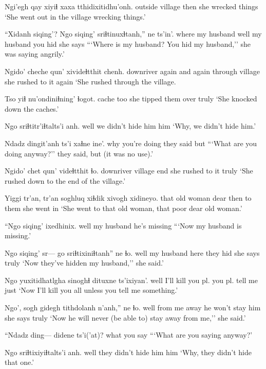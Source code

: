 \documentclass[12pt]{article}
\begin{document}
\gll Ngi'egh qay xiyiɬ {xaxa tthidixitidhu'onh.} 
outside village then {she wrecked things}
\glt `She went out in the village wrecking things.' 
\glend

\gll ``Xidanh siqing'? Ngo siqing' sriɬtinuxɬtanh,'' ne ts'in'. 
where {my husband} well {my husband} {you hid} {she says} {}
\glt ```Where is my husband? You hid my husband,'' she was saying angrily.' 
\glend

\gll Ngido' cheche {qun'} xivideɬtthit chenh. 
{downriver} {again and again} {through village} {she rushed to it} again 
\glt `She rushed through the village.
\glend

\gll Tso yiɬ nu'ondiniɬning' ɬogot. 
cache too {she tipped them over} truly
\glt  `She knocked down the caches.' 
\glend

\gll Ngo sriɬtitr'iɬtalts'i anh. 
well {we didn't hide him} him 
\glt `Why, we didn't hide him.' 
\glend

\gll Ndadz dingit'anh ts'i xaɬne ine'. 
why {you're doing} {} {they said} but
\glt  ```What are you doing anyway?'' they said, but (it was no use).' 
\glend

\gll Ngido' {chet qun'} videɬtthit ɬo. 
downriver {village end} {she rushed to it} truly
\glt `She rushed down to the end of the village.'
\glend

\gll Yiggi tr'an, tr'an soghluq xiɬdik xivogh xidineyo. 
that {old woman} {} dear then {to them} {she went in}
\glt `She went to that old woman, that poor dear old woman.' 
\glend

\gll ``Ngo siqing' ixedhinix. 
well {my husband} {he's missing}
\glt ```Now my husband is missing.' 
\glend

\gll Ngo siqing' sr--- go sriɬtixiniɬtanh'' ne ɬo. 
well {my husband} {} here {they hid} {she says} truly
\glt `Now they've hidden my husband,'' she said.' 
\glend

\gll Ngo yuxitidhatlgha {sinoghɬ dituxne} ts'ixiyan'. 
well {I'll kill you pl.} {you pl. tell me} just
\glt `Now I'll kill you all unless you tell me something.' 
\glend

\gll Ngo', sogh gidegh tithdolanh n'anh,'' ne ɬo. 
well {from me} away {he won't stay} him {she says} truly
\glt `Now he will never (be able to) stay away from me,'' she said.' 
\glend

\gll ``Ndadz ding--- didene ts'i('at)? 
what {} {you say} {} 
\glt ```What are you saying anyway?' 
\glend

\gll Ngo {sriɬtixiyiɬtalts'i} anh. 
well {they didn't hide him} him
\glt  `Why, they didn't hide that one.' 
\glend
\end{document}
